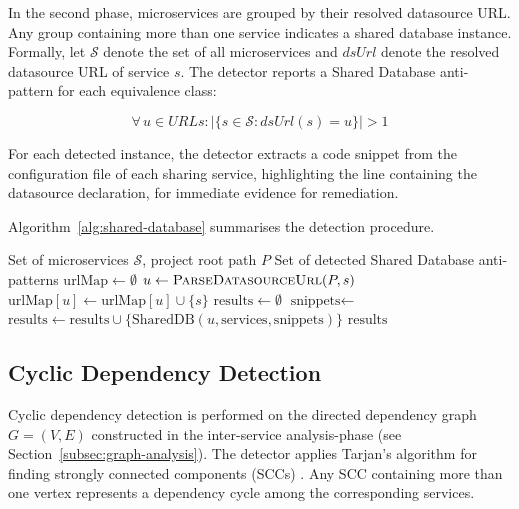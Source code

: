 In the second phase, microservices are grouped by their resolved datasource URL. Any group containing more than one service indicates a shared database instance. Formally, let $\mathcal{S}$ denote the set of all microservices and $\mathit{dsUrl}$ denote the resolved datasource URL of service $s$. The detector reports a Shared Database anti-pattern for each equivalence class:

\begin{equation}
    \forall\, u \in \mathit{URLs} : \bigl|\{s \in \mathcal{S} : \mathit{dsUrl}(s) = u\}\bigr| > 1
    \label{eq:shared-db-detection}
\end{equation}

For each detected instance, the detector extracts a code snippet from the configuration file of each sharing service, highlighting the line containing the datasource declaration, for immediate evidence for remediation.

Algorithm~\ref{alg:shared-database} summarises the detection procedure.

\begin{algorithm}[htbp]
\caption{Shared Database Detection}\label{alg:shared-database}
\begin{algorithmic}[1]
    \Require Set of microservices $\mathcal{S}$, project root path $P$
    \Ensure Set of detected Shared Database anti-patterns
    \State $\text{urlMap} \gets \emptyset$ 
        \State $u \gets \Call{ParseDatasourceUrl}{P, s}$
            \State $\text{urlMap}[u] \gets \text{urlMap}[u] \cup \{s\}$
        \EndIf
    \EndFor
    \State $\text{results} \gets \emptyset$
            \State $\text{snippets} \gets$ 
            \State $\text{results} \gets \text{results} \cup \{\text{SharedDB}(u, \text{services}, \text{snippets})\}$
        \EndIf
    \EndFor
    \State \Return $\text{results}$
\end{algorithmic}
\end{algorithm}

\subsection{Cyclic Dependency Detection}
\label{subsec:detect-cyclic-dependency}

\par Cyclic dependency detection is performed on the directed dependency graph $G = (V, E)$ constructed in the inter-service analysis-phase (see Section~\ref{subsec:graph-analysis}). The detector applies Tarjan's algorithm for finding strongly connected components (SCCs) \cite{Tarjan1972}. Any SCC containing more than one vertex represents a dependency cycle among the corresponding services.

